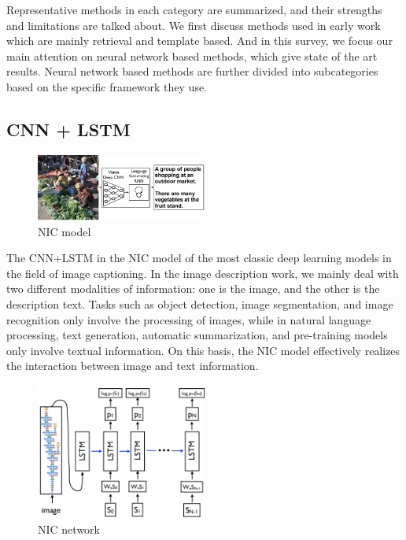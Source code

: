 \documentclass[xelatex,a4j,10pt,twocolumn]{article}
\begin{document}
Representative methods in each category are summarized, and their strengths and limitations are talked about. We first discuss methods used in early work which are mainly retrieval and template based. And in this survey, we focus our main attention on neural network based methods, which give state of the art results. Neural network based methods are further divided into subcategories based on the specific framework they use.
\subsection{CNN + LSTM}

\begin{figure}[h]
	\leftmargin
    \includegraphics[width=0.5\textwidth]{NIC.png}
 	\caption{NIC model}
 	\label{fig:NIC MODEL}
\end{figure}

The CNN+LSTM in the NIC model\cite{DBLP} of the most classic deep learning models in the field of image captioning. In the image description work, we mainly deal with two different modalities of information: one is the image, and the other is the description text. Tasks such as object detection, image segmentation, and image recognition only involve the processing of images, while in natural language processing, text generation, automatic summarization, and pre-training models only involve textual information. On this basis, the NIC model effectively realizes the interaction between image and text information.

\begin{figure}[h]
	\centering
    \includegraphics[width=0.5\textwidth]{NIC1.png}
 	\caption{NIC network}
 	\label{fig:NIC MODEL}
\end{figure}
\end{document}
